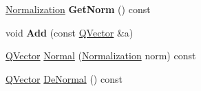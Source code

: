 \begin{DoxyCompactItemize}
\mbox{\hyperlink{classQn_1_1CorrectionQnVector_a2998fe4babb716c57848c8c73b24a398}{Normalization}} {\bfseries Get\+Norm} () const
\item 
\mbox{\label{classQn_1_1QVector_a7dcf06a4f05e9d765cbae05c1e9feeec}} 
void {\bfseries Add} (const \mbox{\hyperlink{classQn_1_1QVector}{Q\+Vector}} \&a)
\item 
\mbox{\hyperlink{classQn_1_1QVector}{Q\+Vector}} \mbox{\hyperlink{classQn_1_1QVector_a97c368ca124a2b52af3b9680b8909d4b}{Normal}} (\mbox{\hyperlink{classQn_1_1CorrectionQnVector_a2998fe4babb716c57848c8c73b24a398}{Normalization}} norm) const
\item 
\mbox{\hyperlink{classQn_1_1QVector}{Q\+Vector}} \mbox{\hyperlink{classQn_1_1QVector_a0333c85d2b5bef4bb6ebb05150e6404f}{De\+Normal}} () const
\end{DoxyCompactItemize}
